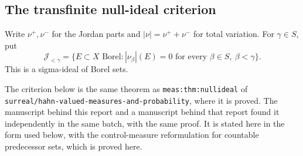 \documentclass[11pt,letterpaper]{article}
\theoremstyle{definition}
\newcommand{\repo}[1]{\nolinkurl{#1}}%
\newcommand{\lbl}[1]{\nolinkurl{#1}}%
\numberwithin{equation}{section}
\begin{document}
\subsection{The transfinite null-ideal criterion}

Write $\nu^+,\nu^-$ for the Jordan parts and $|\nu|=\nu^++\nu^-$ for total variation. For $\gamma\in S$, put
\begin{equation}\label{herg:eq:nullideal}
 \mathcal J_{<\gamma}
 =\{E\subset X\text{ Borel}: |\nu_\beta|(E)=0
       \text{ for every }\beta\in S,\ \beta<\gamma\}.
\end{equation}
This is a sigma-ideal of Borel sets.

The criterion below is the same theorem as \lbl{meas:thm:nullideal} of \repo{surreal/hahn-valued-measures-and-probability}, where it is proved. The manuscript behind this report and a manuscript behind that report found it independently in the same batch, with the same proof. It is stated here in the form used below, with the control-measure reformulation for countable predecessor sets, which is proved here.
\end{document}
